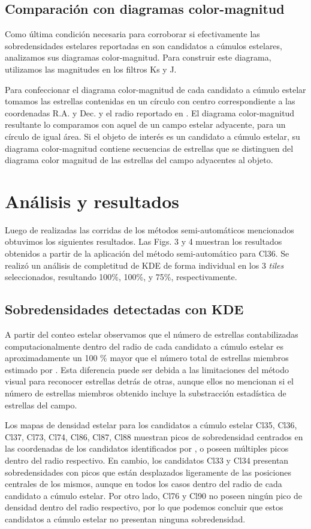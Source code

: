 \documentclass[baaa]{baaa}
\begin{document}
\subsection{Comparación con diagramas color-magnitud}
Como última condición necesaria para corroborar si efectivamente las sobredensidades estelares reportadas en \cite{borissova2011new} son candidatos a cúmulos estelares, analizamos sus diagramas color-magnitud. Para construir este diagrama, utilizamos las magnitudes en los filtros Ks y J.
\par 
Para confeccionar el diagrama color-magnitud de cada candidato a cúmulo estelar tomamos las estrellas contenidas en un círculo con centro correspondiente a las coordenadas R.A. y Dec. y el radio reportado en \cite{borissova2011new}. El diagrama color-magnitud resultante lo comparamos con aquel de un campo estelar adyacente, para un círculo de igual área. Si el objeto de interés es un candidato a cúmulo estelar, su diagrama color-magnitud contiene secuencias de estrellas que se distinguen del diagrama color magnitud de las estrellas del campo adyacentes al objeto.


\section{Análisis y resultados}
Luego de realizadas las corridas de los métodos semi-automáticos mencionados obtuvimos los siguientes resultados. Las Figs. 3 y 4 muestran los resultados obtenidos a partir de la aplicación del método semi-automático para Cl36. Se realizó un análisis de completitud de {\sc KDE} 
 de forma individual en los 3 \textit{tiles} seleccionados, resultando 100\%, 100\%, y 75\%, respectivamente.

\subsection{Sobredensidades detectadas con {\sc KDE}}
A partir  del conteo estelar observamos que el número de estrellas contabilizadas computacionalmente dentro del radio de cada candidato a cúmulo estelar es aproximadamente un 100 \% mayor que el número total de estrellas miembros estimado por \cite{borissova2011new}. Esta diferencia puede ser debida a las limitaciones del método visual para reconocer estrellas detrás de otras, aunque ellos no mencionan si el número de estrellas miembros obtenido incluye la substracción estadística de estrellas del campo. \par
Los mapas de densidad estelar para los candidatos a cúmulo estelar Cl35, Cl36, Cl37, Cl73, Cl74, Cl86, Cl87, Cl88 muestran picos de sobredensidad centrados en las coordenadas de los candidatos identificados por \cite{borissova2011new}, o poseen múltiples picos dentro del radio respectivo. En cambio, los candidatos Cl33 y Cl34 
presentan sobredensidades con picos que están desplazados ligeramente de las posiciones centrales de los mismos, aunque en todos los casos dentro del radio de cada candidato a cúmulo estelar.  Por otro lado, Cl76 y Cl90 no poseen ningún pico de densidad dentro del radio respectivo, por lo que podemos concluir que estos  candidatos a cúmulo estelar no presentan ninguna sobredensidad.
\end{document}
